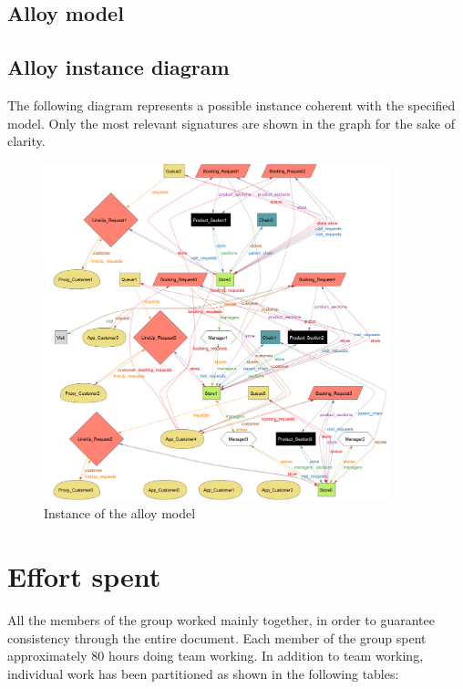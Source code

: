 \documentclass[a4paper,oneside,11pt]{book}   %
\begin{document}
    \section{Alloy model}
    
    \newpage
    \section{Alloy instance diagram}
    The following diagram represents a possible instance coherent with the specified model. Only the most relevant signatures are shown in the graph for the sake of clarity. 
    \begin{figure}[H]
        \centering
        \includegraphics[width=0.9\textwidth, keepaspectratio]{pictures/alloy_instance_diagram}
        \caption{Instance of the alloy model}
        \label{figure:alloy_instance}
    \end{figure}

    
\chapter{Effort spent}
    All the members of the group worked mainly together, in order to guarantee consistency through the entire document. Each member of the group spent approximately 80 hours doing team working. In addition to team working, individual work has been partitioned as shown in the following tables:
\end{document}
